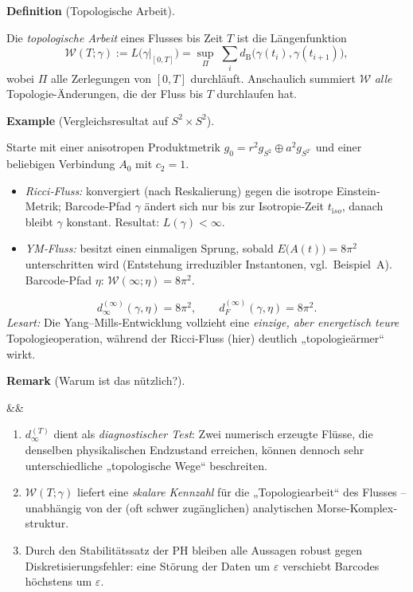 \documentclass[10pt, letterpaper]{article}
\newenvironment{romanenum}[1][]
  {%
    \ifx&#1&
    \else
      \textbf{#1}\quad
    \fi
    \begin{enumerate}[label=\roman*)]
  }
  {%
    \end{enumerate}%
  }
\newcommand{\CustomHeading}[3]{%
  \par\medskip\noindent%
  \textbf{#1 #2} \textnormal{(#3)}.\enskip%
}
\newenvironment{DEF}[2]{\CustomHeading{Definition}{#1}{#2}}{}
\newenvironment{REM}[2]{\CustomHeading{Remark}{#1}{#2}}{}
\newenvironment{EXA}[2]{\CustomHeading{Example}{#1}{#2}}{}
\begin{document}
\begin{DEF}{}{Topologische Arbeit}
  Die \emph{topologische Arbeit} eines Flusses bis Zeit \(T\) ist
  die Längenfunktion
  \[
    \mathcal W(T;\gamma):=
      L\bigl(\gamma|_{[0,T]}\bigr)
      =\sup_{\Pi}\;
         \sum_{i}d_{\mathrm B}\bigl(\gamma(t_i),\gamma(t_{i+1})\bigr),
  \]
  wobei \(\Pi\) alle Zerlegungen von \([0,T]\) durchläuft.
  Anschaulich summiert
  \(\mathcal W\)
  \emph{alle} Topologie-Änderungen, die der Fluss bis \(T\)
  durchlaufen hat.
\end{DEF}

\begin{EXA}{}{Vergleichsresultat auf $S^{2}\!\times\!S^{2}$}
  Starte mit einer anisotropen Produktmetrik
  \(g_0=r^{2}g_{S^{2}}\oplus a^{2}g_{S^{2'}}\)
  und einer beliebigen Verbindung \(A_0\) mit \(c_2=1\).
  \begin{itemize}[leftmargin=1.5em]
    \item \emph{Ricci‐Fluss:}
      konvergiert (nach Reskalierung) gegen die
      isotrope Einstein‐Metrik;
      Barcode‐Pfad \(\gamma\) ändert sich nur
      bis zur Isotropie‐Zeit \(t_{\mathrm iso}\),  
      danach bleibt \(\gamma\) konstant.  
      Resultat:
      \(L(\gamma)<\infty\).
    \item \emph{YM‐Fluss:}
      besitzt einen einmaligen Sprung, sobald
      \(E\bigl(A(t)\bigr)=8\pi^{2}\) unterschritten wird
      (Entstehung irreduzibler Instantonen, vgl.\ Beispiel~A).
      Barcode‐Pfad \(\eta\):
      \(
        \mathcal W(\infty;\eta)=8\pi^{2}.
      \)
  \end{itemize}
  \[
    d_\infty^{(\infty)}(\gamma,\eta)=8\pi^{2},
    \qquad
    d_F^{(\infty)}(\gamma,\eta)=8\pi^{2}.
  \]
  \emph{Lesart:}  
  Die Yang–Mills‐Entwicklung vollzieht
  eine \emph{einzige, aber energetisch teure}
  Topologie­operation,
  während der Ricci‐Fluss (hier) deutlich „topologieärmer“
  wirkt.
\end{EXA}

\begin{REM}{}{Warum ist das nützlich?}
  \begin{romanenum}
  \item $d_\infty^{(T)}$ dient als \emph{diagnostischer Test}:
        Zwei numerisch erzeugte Flüsse, die denselben
        physikalischen Endzustand erreichen, können dennoch
        sehr unterschiedliche „topologische Wege“ beschreiten.
  \item $\mathcal W(T;\gamma)$ liefert eine
        \emph{skalare Kennzahl} für die
        „Topologie­arbeit“ des Flusses –
        unabhängig von der (oft schwer zugänglichen)
        analytischen Morse-Komplex­struktur.
  \item Durch den Stabilitäts­satz der PH
        bleiben alle Aussagen robust gegen
        Diskretisierungs­fehler:
        eine Störung der Daten um $\varepsilon$
        verschiebt Barcodes höchstens um $\varepsilon$.
  \end{romanenum}
\end{REM}
\end{document}
